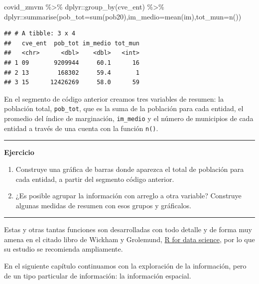\documentclass[
  11pt,
  oneside]{book}
\newenvironment{Shaded}{\begin{snugshade}}{\end{snugshade}}
\newcommand{\AttributeTok}[1]{\textcolor[rgb]{0.77,0.63,0.00}{#1}}
\newcommand{\FunctionTok}[1]{\textcolor[rgb]{0.00,0.00,0.00}{#1}}
\newcommand{\NormalTok}[1]{#1}
\newcommand{\SpecialCharTok}[1]{\textcolor[rgb]{0.00,0.00,0.00}{#1}}
\begin{document}
\begin{Shaded}
\begin{Highlighting}[]
\NormalTok{covid\_zmvm }\SpecialCharTok{\%\textgreater{}\%} 
\NormalTok{  dplyr}\SpecialCharTok{::}\FunctionTok{group\_by}\NormalTok{(cve\_ent) }\SpecialCharTok{\%\textgreater{}\%}
\NormalTok{  dplyr}\SpecialCharTok{::}\FunctionTok{summarise}\NormalTok{(}\AttributeTok{pob\_tot=}\FunctionTok{sum}\NormalTok{(pob20),}\AttributeTok{im\_medio=}\FunctionTok{mean}\NormalTok{(im),}\AttributeTok{tot\_mun=}\FunctionTok{n}\NormalTok{())}
\end{Highlighting}
\end{Shaded}

\begin{verbatim}
## # A tibble: 3 x 4
##   cve_ent  pob_tot im_medio tot_mun
##   <chr>      <dbl>    <dbl>   <int>
## 1 09       9209944     60.1      16
## 2 13        168302     59.4       1
## 3 15      12426269     58.0      59
\end{verbatim}

En el segmento de código anterior creamos tres variables de resumen: la población total, \texttt{pob\_tot}, que es la suma de la población para cada entidad, el promedio del índice de marginación, \texttt{im\_medio} y el número de municipios de cada entidad a través de una cuenta con la función \texttt{n()}.

\begin{center}\rule{0.5\linewidth}{0.5pt}\end{center}

\textbf{Ejercicio}

\begin{enumerate}
\def\labelenumi{\roman{enumi}.}
\item
  Construye una gráfica de barras donde aparezca el total de población para cada entidad, a partir del segmento código anterior.
\item
  ¿Es posible agrupar la información con arreglo a otra variable? Construye algunas medidas de resumen con esos grupos y gráficalos.
\end{enumerate}

\begin{center}\rule{0.5\linewidth}{0.5pt}\end{center}

Estas y otras tantas funciones son desarrolladas con todo detalle y de forma muy amena en el citado libro de Wickham y Grolemund, \href{https://r4ds.had.co.nz/}{R for data science}, por lo que su estudio se recomienda ampliamente.

En el siguiente capítulo continuamos con la exploración de la información, pero de un tipo particular de información: la información espacial.

  
\end{document}
